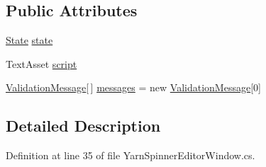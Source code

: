 \subsection*{Public Attributes}
\begin{DoxyCompactItemize}
\item 
\hyperlink{a00039_ab24848d7951ce44eb3c7768c6ee10385}{State} \hyperlink{a00039_a7202b24bd068da24d7e28bec5668b13a}{state}
\item 
Text\-Asset \hyperlink{a00039_a6c852f7521c0a91b519aa3d391f63e6b}{script}
\item 
\hyperlink{a00176_a00365}{Validation\-Message}\mbox{[}$\,$\mbox{]} \hyperlink{a00039_a808a039e280cf875cb3c9e9385148498}{messages} = new \hyperlink{a00176_a00365}{Validation\-Message}\mbox{[}0\mbox{]}
\end{DoxyCompactItemize}


\subsection{Detailed Description}


Definition at line 35 of file Yarn\-Spinner\-Editor\-Window.\-cs.




